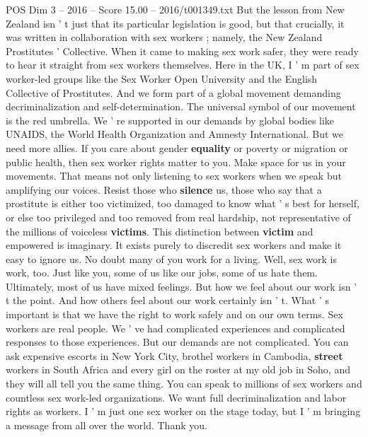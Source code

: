\begin{textsample}{POS Dim 3 – 2016 – Score 15.00 – 2016/t001349.txt}
But the lesson from New Zealand isn ' t just that its particular legislation is good, but that crucially, it was written in collaboration with sex workers ; namely, the New Zealand Prostitutes ' Collective.
When it came to making sex work safer, they were ready to hear it straight from sex workers themselves.
Here in the UK, I ' m part of sex worker-led groups like the Sex Worker Open University and the English Collective of Prostitutes.
And we form part of a global movement demanding decriminalization and self-determination.
The universal symbol of our movement is the red umbrella.
We ' re supported in our demands by global bodies like UNAIDS, the World Health Organization and Amnesty International.
But we need more allies.
If you care about gender \textbf{equality} or poverty or migration or public health, then sex worker rights matter to you.
Make space for us in your movements.
That means not only listening to sex workers when we speak but amplifying our voices.
Resist those who \textbf{silence} us, those who say that a prostitute is either too victimized, too damaged to know what ' s best for herself, or else too privileged and too removed from real hardship, not representative of the millions of voiceless \textbf{victims}.
This distinction between \textbf{victim} and empowered is imaginary.
It exists purely to discredit sex workers and make it easy to ignore us.
No doubt many of you work for a living.
Well, sex work is work, too.
Just like you, some of us like our jobs, some of us hate them.
Ultimately, most of us have mixed feelings.
But how we feel about our work isn ' t the point.
And how others feel about our work certainly isn ' t.
What ' s important is that we have the right to work safely and on our own terms.
Sex workers are real people.
We ' ve had complicated experiences and complicated responses to those experiences.
But our demands are not complicated.
You can ask expensive escorts in New York City, brothel workers in Cambodia, \textbf{street} workers in South Africa and every girl on the roster at my old job in Soho, and they will all tell you the same thing.
You can speak to millions of sex workers and countless sex work-led organizations.
We want full decriminalization and labor rights as workers.
I ' m just one sex worker on the stage today, but I ' m bringing a message from all over the world.
Thank you.

\end{textsample}
